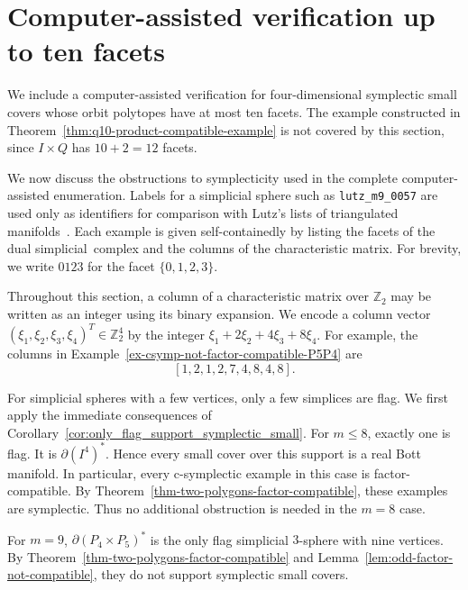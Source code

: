 \documentclass{amsart}
\numberwithin{equation}{section}
\theoremstyle{definition}
\theoremstyle{remark}
\newcommand{\Z}{\mathbb Z}
\begin{document}
\appendix
\section{Computer-assisted verification up to ten facets}
\label{sec-four-dimensional-up-to-ten}

We include a computer-assisted verification for four-dimensional symplectic small covers whose orbit polytopes have at most ten facets.
The example constructed in Theorem~\ref{thm:q10-product-compatible-example} is not covered by this section, since $I \times Q$ has $10+2=12$ facets.

We now discuss the obstructions to symplecticity used in the complete computer-assisted enumeration.
Labels for a simplicial sphere such as \texttt{lutz\_m9\_0057} are used only as identifiers for comparison with Lutz's lists of triangulated manifolds~\cite{LutzManifoldPage3Manifolds,Lutz1999book}.
Each example is given self-containedly by listing the facets of the dual simplicial~complex and the columns of the characteristic matrix.
For brevity, we write $0123$ for the facet $\{0,1,2,3\}$.

Throughout this section, a column of a characteristic matrix over $\Z_2$ may be written as an integer using its binary expansion.
We encode a column vector $(\xi_1,\xi_2,\xi_3,\xi_4)^T \in \Z_2^4$ by the integer $\xi_1 + 2 \xi_2 + 4 \xi_3 + 8 \xi_4$.
For example, the columns in Example~\ref{ex-csymp-not-factor-compatible-P5P4} are
$$
    [1,2,1,2,7,4,8,4,8].
$$

For simplicial spheres with a few vertices, only a few simplices are flag.
We first apply the immediate consequences of Corollary~\ref{cor:only_flag_support_symplectic_small}.
For $m\leq 8$, exactly one is flag.
It is $\partial (I^4)^\ast$.
Hence every small cover over this support is a real Bott manifold.
In particular, every c-symplectic example in this case is factor-compatible.
By Theorem~\ref{thm-two-polygons-factor-compatible}, these examples are symplectic.
Thus no additional obstruction is needed in the $m=8$ case.

For $m=9$, $\partial (P_4 \times P_5)^\ast$ is the only flag simplicial $3$-sphere with nine vertices.
By Theorem~\ref{thm-two-polygons-factor-compatible} and Lemma~\ref{lem:odd-factor-not-compatible}, they do not support symplectic small covers.
\end{document}
